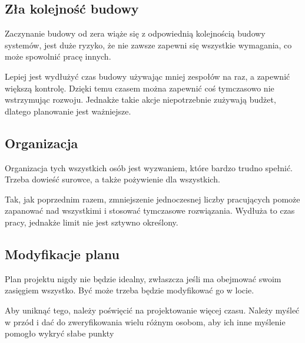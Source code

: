 \subsection{Zła kolejność budowy}
Zaczynanie budowy od zera wiąże się z odpowiednią kolejnością budowy systemów, jest duże ryzyko, że nie zawsze zapewni się wszystkie wymagania, co może spowolnić pracę innych. 

Lepiej jest wydłużyć czas budowy używając mniej zespołów na raz, a zapewnić większą kontrolę. Dzięki temu czasem można zapewnić coś tymczasowo nie wstrzymując rozwoju.
Jednakże takie akcje niepotrzebnie zużywają budżet, dlatego planowanie jest ważniejsze.

\subsection{Organizacja}
Organizacja tych wszystkich osób jest wyzwaniem, które bardzo trudno spełnić. Trzeba dowieść surowce, a także pożywienie dla wszystkich. 

Tak, jak poprzednim razem, zmniejszenie jednoczesnej liczby pracujących pomoże zapanować nad wszystkimi i stosować tymczasowe rozwiązania.
Wydłuża to czas pracy, jednakże limit nie jest sztywno określony.
 
\subsection{Modyfikacje planu}
Plan projektu nigdy nie będzie idealny, zwłaszcza jeśli ma obejmować swoim zasięgiem wszystko. Być może trzeba będzie modyfikować go w locie. 

Aby uniknąć tego, należy poświęcić na projektowanie więcej czasu. Należy myśleć w przód i dać do zweryfikowania wielu różnym osobom, aby ich inne myślenie pomogło wykryć słabe punkty




